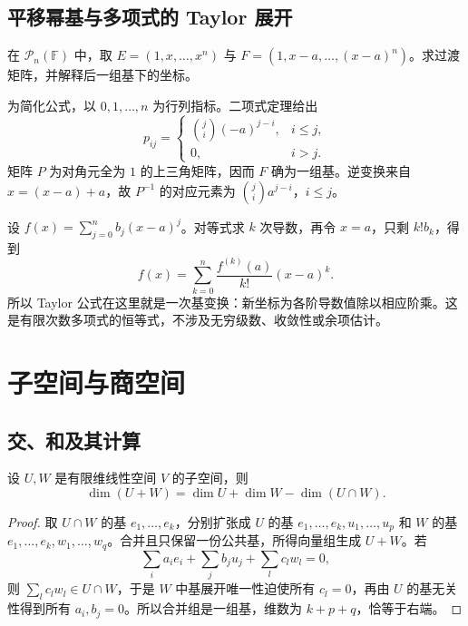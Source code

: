 \subsection{平移幂基与多项式的 Taylor 展开}

\begin{example}
\label{ex:laex-taylor-basis}
在 $\mathcal P_n(\mathbb F)$ 中，取 $E=(1,x,\ldots,x^n)$ 与 $F=(1,x-a,\ldots,(x-a)^n)$。求过渡矩阵，并解释后一组基下的坐标。
\end{example}

\begin{solve}
为简化公式，以 $0,1,\ldots,n$ 为行列指标。二项式定理给出
\[
p_{ij}=\begin{cases}\binom ji(-a)^{j-i},&i\le j,\\0,&i>j.\end{cases}
\]
矩阵 $P$ 为对角元全为 $1$ 的上三角矩阵，因而 $F$ 确为一组基。逆变换来自 $x=(x-a)+a$，故 $P^{-1}$ 的对应元素为 $\binom ji a^{j-i}$，$i\le j$。

设 $f(x)=\sum_{j=0}^n b_j(x-a)^j$。对等式求 $k$ 次导数，再令 $x=a$，只剩 $k!b_k$，得到
\begin{equation}
\label{eq:laex-polynomial-taylor}
f(x)=\sum_{k=0}^n\frac{f^{(k)}(a)}{k!}(x-a)^k.
\end{equation}
所以 Taylor 公式在这里就是一次基变换：新坐标为各阶导数值除以相应阶乘。这是有限次数多项式的恒等式，不涉及无穷级数、收敛性或余项估计。
\end{solve}

\section{子空间与商空间}
\label{sec:laex-subspace-quotient}

\subsection{交、和及其计算}

\begin{theorem}
\label{thm:laex-dimension-sum}
设 $U,W$ 是有限维线性空间 $V$ 的子空间，则
\begin{equation}
\label{eq:laex-dimension-sum}
\dim(U+W)=\dim U+\dim W-\dim(U\cap W).
\end{equation}
\end{theorem}

\begin{proof}
取 $U\cap W$ 的基 $e_1,\ldots,e_k$，分别扩张成 $U$ 的基 $e_1,\ldots,e_k,u_1,\ldots,u_p$ 和 $W$ 的基 $e_1,\ldots,e_k,w_1,\ldots,w_q$。合并且只保留一份公共基，所得向量组生成 $U+W$。若
\[
\sum_i a_ie_i+\sum_j b_ju_j+\sum_l c_lw_l=0,
\]
则 $\sum_l c_lw_l\in U\cap W$，于是 $W$ 中基展开唯一性迫使所有 $c_l=0$，再由 $U$ 的基无关性得到所有 $a_i,b_j=0$。所以合并组是一组基，维数为 $k+p+q$，恰等于右端。
\end{proof}

